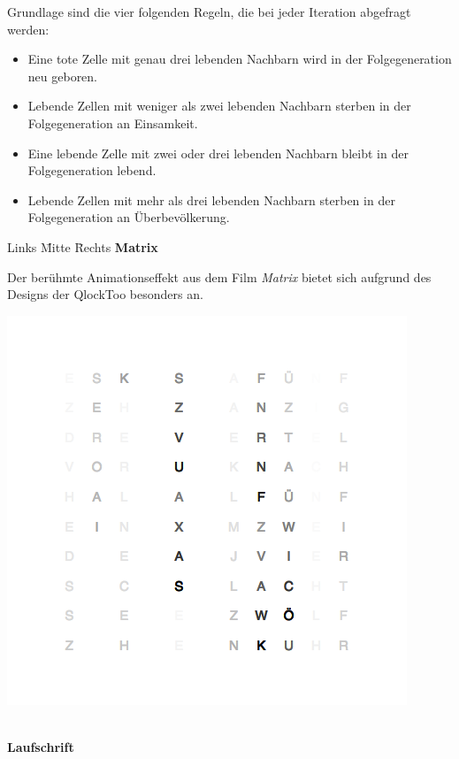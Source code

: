 \begin{multicols}{2}
Grundlage sind die vier folgenden Regeln, die bei jeder Iteration abgefragt werden:
\begin{itemize}
\item Eine tote Zelle mit genau drei lebenden Nachbarn wird in der Folgegeneration neu geboren.
\item Lebende Zellen mit weniger als zwei lebenden Nachbarn sterben in der Folgegeneration an Einsamkeit.
\item Eine lebende Zelle mit zwei oder drei lebenden Nachbarn bleibt in der Folgegeneration lebend.
\item Lebende Zellen mit mehr als drei lebenden Nachbarn sterben in der Folgegeneration an Überbevölkerung.
\end{itemize}

\begin{tabbing}  
 Links \= Mitte \= Rechts \kill
 \> \textbf{Matrix}
\end{tabbing}

Der berühmte Animationseffekt aus dem Film \emph{Matrix} bietet sich aufgrund des Designs der QlockToo besonders an.

{
    \centering
    \includegraphics[width=\columnwidth]{Abbildungen/Software/Demo/Matrix}
    
}
\ \\
\textbf{Laufschrift}


\end{multicols}
